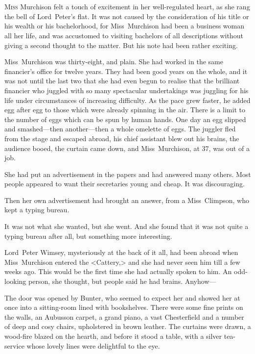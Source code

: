 \chapter[Chapter \thechapter]{}
\lettrine{M}{iss} Murchison felt a touch of excitement in her well-regulated heart, as she rang the bell of Lord~Peter's flat. It was not caused by the consideration of his title or his wealth or his bachelorhood, for Miss~Murchison had been a business woman all her life, and was accustomed to visiting bachelors of all descriptions without giving a second thought to the matter. But his note had been rather exciting.

Miss~Murchison was thirty-eight, and plain. She had worked in the same financier's office for twelve years. They had been good years on the whole, and it was not until the last two that she had even begun to realise that the brilliant financier who juggled with so many spectacular undertakings was juggling for his life under circumstances of increasing difficulty. As the pace grew faster, he added egg after egg to those which were already spinning in the air. There is a limit to the number of eggs which can be spun by human hands. One day an egg slipped and smashed—then another—then a whole omelette of eggs. The juggler fled from the stage and escaped abroad, his chief assistant blew out his brains, the audience booed, the curtain came down, and Miss~Murchison, at 37, was out of a job.

She had put an advertisement in the papers and had answered many others. Most people appeared to want their secretaries young and cheap. It was discouraging.

Then her own advertisement had brought an answer, from a Miss~Climpson, who kept a typing bureau.

It was not what she wanted, but she went. And she found that it was not quite a typing bureau after all, but something more interesting.

Lord~Peter Wimsey, mysteriously at the back of it all, had been abroad when Miss~Murchison entered the <Cattery,> and she had never seen him till a few weeks ago. This would be the first time she had actually spoken to him. An odd-looking person, she thought, but people said he had brains. Anyhow—

The door was opened by Bunter, who seemed to expect her and showed her at once into a sitting-room lined with bookshelves. There were some fine prints on the walls, an Aubusson carpet, a grand piano, a vast Chesterfield and a number of deep and cosy chairs, upholstered in brown leather. The curtains were drawn, a wood-fire blazed on the hearth, and before it stood a table, with a silver tea-service whose lovely lines were delightful to the eye.

